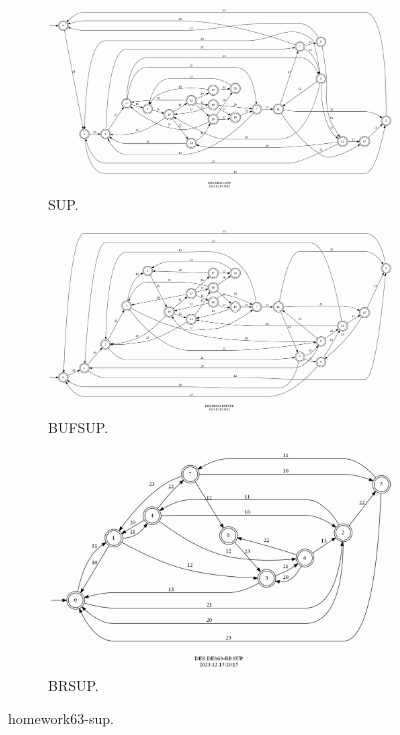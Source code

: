 \documentclass{article}
\begin{document}
\begin{figure}[h!]
  \centering
  \begin{subfigure}{0.6\linewidth}
    \includegraphics[width=\linewidth]{assets/DES63-SUP.jpg}
     \caption{SUP.}
  \end{subfigure}
  \begin{subfigure}{0.6\linewidth}
    \includegraphics[width=\linewidth]{assets/DES63-BUFSUP.jpg}
     \caption{BUFSUP.}
  \end{subfigure}
  \begin{subfigure}{0.5\linewidth}
    \includegraphics[width=\linewidth]{assets/DES63-BRSUP.jpg}
    \caption{BRSUP.}
  \end{subfigure}
  \caption{homework63-sup.}
  \label{fig:des63-sup}
\end{figure}
\end{document}
